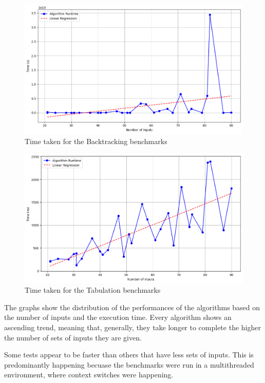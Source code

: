 \documentclass{llncs}
\begin{document}
\begin{figure}[h]
    \centering
    \includegraphics[width=\textwidth]{img/backtracking.png}
    \caption{Time taken for the Backtracking benchmarks}
    \label{fig:backtracking}
\end{figure}

\begin{figure}[h]
    \centering
    \includegraphics[width=\textwidth]{img/tabulation.png}
    \caption{Time taken for the Tabulation benchmarks}
    \label{fig:tabulation}
\end{figure}
\clearpage

The graphs show the distribution of the performances of the algorithms
based on the number of inputs and the execution time. Every algorithm shows
an ascending trend, meaning that, generally, they take longer to complete
the higher the number of sets of inputs they are given.

Some tests appear to be faster than others that have less sets of inputs.
This is predominantly happening becuase the benchmarks were run in a multithreaded
environment, where context switches were happening.
\end{document}
